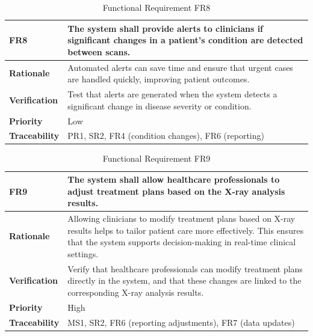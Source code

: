 \documentclass[12pt]{article}
\begin{document}
\begin{table}[h!]
\centering
{}
\begin{tabular}{|p{3.5cm}|p{11.5cm}|}
\hline
\rowcolor{gray!30}
\textbf{FR8} & The system shall provide alerts to clinicians if significant changes in a patient's condition are detected between scans. \\
\hline
\textbf{Rationale} & Automated alerts can save time and ensure that urgent cases are handled quickly, improving patient outcomes. \\
\hline
\textbf{Verification} & Test that alerts are generated when the system detects a significant change in disease severity or condition. \\
\hline
\textbf{Priority} & Low \\
\hline
\textbf{Traceability} & PR1, SR2, FR4 (condition changes), FR6 (reporting) \\
\hline
\end{tabular}
\caption{Functional Requirement FR8}
\end{table}
\begin{table}[h!]
  \centering
  \begin{tabular}{|p{3.5cm}|p{11.5cm}|}
  \hline
  \rowcolor{gray!30}
  \textbf{FR9} & The system shall allow healthcare professionals to adjust treatment plans based on the X-ray analysis results. \\
  \hline
  \textbf{Rationale} & Allowing clinicians to modify treatment plans based on X-ray results helps to tailor patient care more effectively. This ensures that the system supports decision-making in real-time clinical settings. \\
  \hline
  \textbf{Verification} & Verify that healthcare professionals can modify treatment plans directly in the system, and that these changes are linked to the corresponding X-ray analysis results. \\
  \hline
  \textbf{Priority} & High \\
  \hline
  \textbf{Traceability} & MS1, SR2, FR6 (reporting adjustments), FR7 (data updates) \\
  \hline
  \end{tabular}
  \caption{Functional Requirement FR9}
  \end{table}
\end{document}
